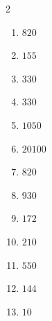 \documentclass[11pt]{article}
\begin{document}
\begin{keybox}
\begin{multicols}{2}
\small
\begin{enumerate}[leftmargin=*,itemsep=3pt]
  \item $820$
  \item $155$
  \item $330$
  \item $330$
  \item $1050$
  \item $20100$
  \item $820$
  \item $930$
  \item $172$
  \item $210$
  \item $550$
  \item $144$
  \item $10$
\end{enumerate}
\end{multicols}
\end{keybox}
\end{document}

